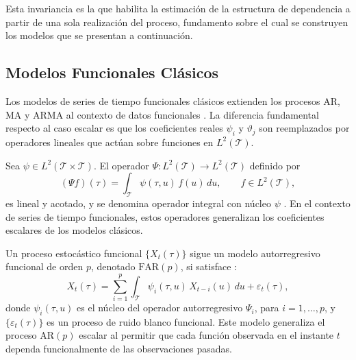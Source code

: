 Esta invariancia es la que habilita la estimación de la estructura de dependencia a partir de una sola realización del proceso, fundamento sobre el cual se construyen los modelos que se presentan a continuación.

\subsection{Modelos Funcionales Clásicos}
\label{02_02_02_modelos_funcionales_clasicos}
Los modelos de series de tiempo funcionales clásicos extienden los procesos AR, MA y ARMA al contexto de datos funcionales \cite{02_02_bosq2000linear}. La diferencia fundamental respecto al caso escalar es que los coeficientes reales $\psi_i$ y $\vartheta_j$ son reemplazados por operadores lineales que actúan sobre funciones en $L^2(\mathcal{T})$.

\begin{definition}
Sea $\psi \in L^2(\mathcal{T} \times \mathcal{T})$. El operador $\Psi: L^2(\mathcal{T}) \to L^2(\mathcal{T})$ definido por
\begin{equation}
    (\Psi f)(\tau) = \int_{\mathcal{T}} \psi(\tau, u)\, f(u)\, du,
    \qquad f \in L^2(\mathcal{T}),
\end{equation}
es lineal y acotado, y se denomina operador integral con núcleo $\psi$ \cite{02_02_bosq2000linear, 02_02_hsing2015theoretical}. En el contexto de series de tiempo funcionales, estos operadores generalizan los coeficientes escalares de los modelos clásicos.
\end{definition}

\begin{definition} Un proceso estocástico funcional $\{X_t(\tau)\}$ sigue un modelo autorregresivo funcional de orden $p$, denotado $\mathrm{FAR}(p)$, si satisface \cite{02_02_bosq2000linear, 02_02_aue2015prediction}:
\begin{equation}
    X_t(\tau) = \sum_{i=1}^{p} \int_{\mathcal{T}} \psi_i(\tau, u)\,
    X_{t-i}(u)\, du + \varepsilon_t(\tau),
\end{equation}
donde $\psi_i(\tau, u)$ es el núcleo del operador autorregresivo $\Psi_i$, para $i = 1, \dots, p$, y $\{\varepsilon_t(\tau)\}$ es un proceso de ruido blanco funcional. Este modelo generaliza el proceso $\mathrm{AR}(p)$ escalar al permitir que cada función observada en el instante $t$ dependa funcionalmente de las observaciones pasadas.
\end{definition}

